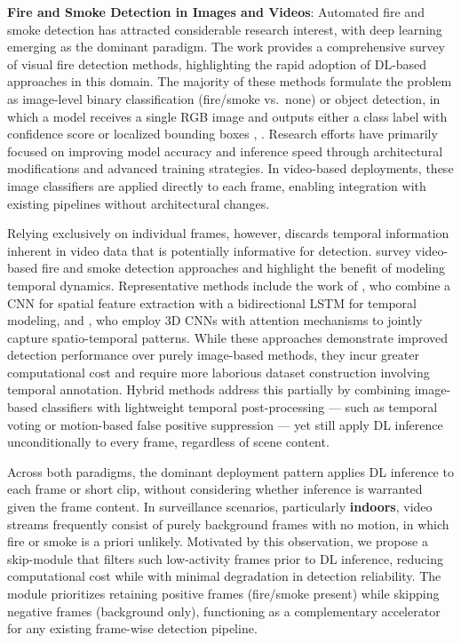 \documentclass[
  10pt,
]{article}
\begin{document}
\textbf{Fire and Smoke Detection in Images and Videos}: Automated fire
and smoke detection has attracted considerable research interest, with
deep learning emerging as the dominant paradigm. The work
 provides a comprehensive survey
of visual fire detection methods, highlighting the rapid adoption of
DL-based approaches in this domain. The majority of these methods
formulate the problem as image-level binary classification (fire/smoke
vs.~none) or object detection, in which a model receives a single RGB
image and outputs either a class label with confidence score or
localized bounding boxes ,
. Research efforts have
primarily focused on improving model accuracy and inference speed
through architectural modifications and advanced training strategies. In
video-based deployments, these image classifiers are applied directly to
each frame, enabling integration with existing pipelines without
architectural changes.

Relying exclusively on individual frames, however, discards temporal
information inherent in video data that is potentially informative for
detection.  survey video-based
fire and smoke detection approaches and highlight the benefit of
modeling temporal dynamics. Representative methods include the work of
, who combine a CNN for spatial
feature extraction with a bidirectional LSTM for temporal modeling, and
, who employ 3D CNNs with attention
mechanisms to jointly capture spatio-temporal patterns. While these
approaches demonstrate improved detection performance over purely
image-based methods, they incur greater computational cost and require
more laborious dataset construction involving temporal annotation.
Hybrid methods address this partially by combining image-based
classifiers with lightweight temporal post-processing --- such as
temporal voting  or motion-based
false positive suppression
 --- yet still apply DL
inference unconditionally to every frame, regardless of scene content.

Across both paradigms, the dominant deployment pattern applies DL
inference to each frame or short clip, without considering whether
inference is warranted given the frame content. In surveillance
scenarios, particularly \textbf{indoors}, video streams frequently
consist of purely background frames with no motion, in which fire or
smoke is a priori unlikely. Motivated by this observation, we propose a
skip-module that filters such low-activity frames prior to DL inference,
reducing computational cost while with minimal degradation in detection
reliability. The module prioritizes retaining positive frames
(fire/smoke present) while skipping negative frames (background only),
functioning as a complementary accelerator for any existing frame-wise
detection pipeline.
\end{document}

